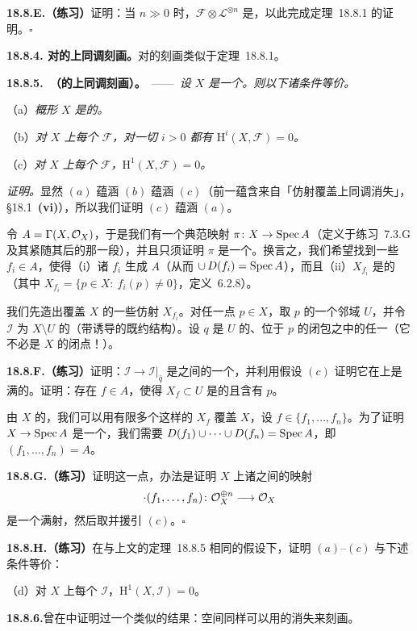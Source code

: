\textbf{18.8.E.（练习）}\quad 证明：当 $n\gg 0$ 时，$\mathscr{F}\otimes\mathscr{L}^{\otimes n}$ 是\trGloballyGenerated，以此完成\mbox{定理~18.8.1} 的证明。\hfill$\square$

\textbf{18.8.4. \trSerre{}对\trAffineness{}的上同调刻画。}\quad \trSerre{}对\trAffineness{}的刻画类似于\mbox{定理~18.8.1}。

\textbf{18.8.5.\ \trhTheorem（\trAffineness{}的\trSerre{}上同调刻画）。}\ ——\ \emph{设 $X$ 是一个\trQuasicompact\trSeparated\trScheme。则以下诸条件等价。}

（a）\emph{概形 $X$ 是\trAffine{}的。}

（b）\emph{对 $X$ 上每个\trQCSheaf{} $\mathscr{F}$，对一切 $i>0$ 都有 $\mathrm{H}^i(X,\mathscr{F})=0$。}

（c）\emph{对 $X$ 上每个\trQCSheaf{} $\mathscr{F}$，$\mathrm{H}^1(X,\mathscr{F})=0$。}

\emph{证明。}\quad 显然 $(a)$ 蕴涵 $(b)$ 蕴涵 $(c)$（前一蕴含来自「仿射覆盖上同调消失」，\S18.1~\textbf{(vi)}），所以我们证明 $(c)$ 蕴涵 $(a)$。

令 $A=\Gamma(X,\mathcal{O}_X)$，于是我们有一个典范映射 $\pi\colon X\to\operatorname{Spec} A$（定义于\mbox{练习~7.3.G} 及其紧随其后的那一段），并且只须证明 $\pi$ 是一个\trAffine\trMorphism。换言之，我们希望找到一些 $f_i\in A$，使得（i）诸 $f_i$ 生成 $A$（从而 $\cup\,D(f_i)=\operatorname{Spec} A$），而且（ii）$X_{f_i}$ 是\trAffine{}的（其中 $X_{f_i}=\{p\in X:\ f_i(p)\neq 0\}$，\mbox{定义~6.2.8}）。

我们先造出覆盖 $X$ 的一些仿射 $X_{f_i}$。对任一点 $p\in X$，取 $p$ 的一个\trAffine{}邻域 $U$，并令 $\mathscr{I}$ 为 $X\setminus U$ 的\trIdealSheaf（带诱导的既约\trSubscheme{}结构）。设 $q$ 是 $U$ 的、位于 $p$ 的闭包之中的任一\trClosedPoint（它不必是 $X$ 的闭点！）。

\textbf{18.8.F.（练习）}\quad 证明：$\mathscr{I}\to\mathscr{I}|_{\bar{q}}$ 是\trQCSheaf{}之间的一个\trSurjectiveMap，并利用假设 $(c)$ 证明它在\trGlobalSections{}上是满的。证明：存在 $f\in A$，使得 $X_f\subset U$ 是\trAffine{}的且含有 $p$。

由 $X$ 的\trQuasicompactness，我们可以用有限多个这样的 $X_f$ 覆盖 $X$，设 $f\in\{f_1,\dots,f_n\}$。为了证明 $X\to\operatorname{Spec} A$ 是一个\trAffine\trMorphism，我们需要 $D(f_1)\cup\cdots\cup D(f_n)=\operatorname{Spec} A$，即 $(f_1,\dots,f_n)=A$。

\textbf{18.8.G.（练习）}\quad 证明这一点，办法是证明 $X$ 上诸\trQCSheaf{}之间的映射
\[
\cdot(f_1,\dots,f_n)\colon\mathcal{O}_X^{\oplus n}\longrightarrow\mathcal{O}_X
\]
是一个满射，然后取\trGlobalSections{}并援引 $(c)$。\hfill$\square$

\textbf{18.8.H.（练习）}\quad 在与上文的\mbox{定理~18.8.5} 相同的假设下，证明 $(a)$--$(c)$ 与下述条件等价：

（d）对 $X$ 上每个\trQC{}\trIdealSheaf{} $\mathscr{I}$，$\mathrm{H}^1(X,\mathscr{I})=0$。

\textbf{18.8.6.}\quad \trSerre{}曾在\trComplexAnalyticGeometry{}中证明过一个类似的结果：\trStein{}空间同样可以用\trCoherentSheaf{}\trCohomology{}的消失来刻画。
